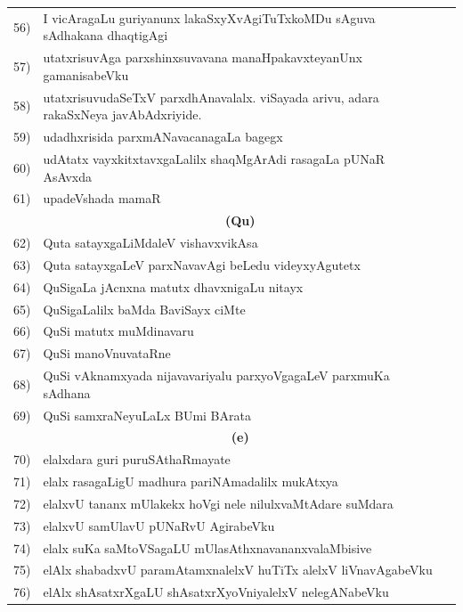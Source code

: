 {\begin{longtable}{@{}cp{7.4cm}r}
56) & I vicAragaLu guriyanunx lakaSxyXvAgiTuTxkoMDu sAguva sAdhakana dhaqtigAgi & \pageref{page218}\\
57) & utatxrisuvAga parxshinxsuvavana manaHpakavxteyanUnx gamanisa\-beVku & \pageref{page219}\\
58) & utatxrisuvudaSeTxV parxdhAnavalalx. viSayada arivu, adara rakaSxNeya javAbAdxriyide.& \pageref{page176}\\
59) & udadhxrisida parxmANavacanagaLa bagegx   & \pageref{page229}\\
60) & udAtatx vayxkitxtavxgaLalilx shaqMgArAdi rasagaLa pUNaR AsAvxda  & \pageref{page229}\\
61) & upadeVshada mamaR  & \pageref{page83}\\[0.5cm]
    &  \multicolumn{1}{c}{\textbf{(Qu)}} & \\[0.5cm] 
62) & Quta satayxgaLiMdaleV vishavxvikAsa  & \pageref{page87}\\   
63) & Quta satayxgaLeV parxNavavAgi beLedu videyxyAgutetx & \pageref{page87}\\
64) & QuSigaLa jAcnxna matutx dhavxnigaLu nitayx & \pageref{page122}\\
65) & QuSigaLalilx baMda BaviSayx ciMte & \pageref{page106}\\
66) & QuSi matutx muMdinavaru & \pageref{page123}\\
67)  & QuSi manoVnuvataRne & \pageref{page114}\\
68) & QuSi vAknamxyada nijavavariyalu parxyoVgagaLeV parxmuKa sAdhana & \pageref{page143}\\
69)  & QuSi samxraNeyuLaLx BUmi BArata & \pageref{page104}\\[0.3cm]
     &  \multicolumn{1}{c}{\textbf{(e)}} & \\[0.3cm]
70) & elalxdara guri puruSAthaRmayate & \pageref{page96}\\
71) & elalx rasagaLigU madhura pariNAmadalilx mukAtxya & \pageref{page231}\\
72)  & elalxvU tananx mUlakekx hoVgi nele nilulxvaMtAdare suMdara & \pageref{page246}\\
73) & elalxvU samUlavU pUNaRvU AgirabeVku & \pageref{page190}\\
74)  & elalx suKa saMtoVSagaLU mUlasAthxnavananxvalaMbisive & \pageref{page194}\\
75) & elAlx shabadxvU paramAtamxnalelxV huTiTx alelxV liVnavAgabeVku & \pageref{page182}\\
76) & elAlx shAsatxrXgaLU shAsatxrXyoVniyalelxV nelegANabeVku & \pageref{page179}\\[0.3cm]  

\end{longtable}}
